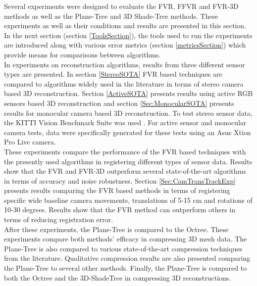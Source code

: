 Several experiments were designed to evaluate the FVR, FFVR and FVR-3D methods as well as the Plane-Tree and 3D Shade-Tree methods. These experiments as well as their conditions and results are presented in this section. In the next section (section \ref{ToolsSection}), the tools used to run the experiments are introduced along with various error metrics (section \ref{metricsSection}) which provide means for comparisons between algorithms. \\

In experiments on reconstruction algorithms, results from three different sensor types are presented. In section \ref{StereoSOTA} FVR based techniques are compared to algorithms widely used in the literature in terms of stereo camera based 3D reconstruction. Section \ref{ActiveSOTA} presents results using active RGB sensors based 3D reconstruction and section \ref{Sec:MonocularSOTA} presents results for monocular camera based 3D reconstruction. To test stereo sensor data, the KITTI Vision Benchmark Suite was used \cite{Geiger13Vision}. For active sensor and monocular camera tests, data were specifically generated for these tests using an Asus Xtion Pro Live camera. \\

These experiments compare the performance of the FVR based techniques with the presently used algorithms in registering different types of sensor data. Results show that the FVR and FVR-3D outperform several state-of-the-art algorithms in terms of accuracy and noise robustness. Section \ref{Sec:CamTransTrackExp} presents results comparing the FVR based methods in terms of registering specific wide baseline camera movements, translations of 5-15 cm and rotations of 10-30 degrees. Results show that the FVR method can outperform others in terms of reducing registration error. \\

After these experiments, the Plane-Tree is compared to the Octree. These experiments compare both methods' efficacy in compressing 3D mesh data. The Plane-Tree is also compared to various state-of-the-art compression techniques from the literature. Qualitative compression results are also presented comparing the Plane-Tree to several other methods. Finally, the Plane-Tree is compared to both the Octree and the 3D-ShadeTree in compressing 3D reconstructions. \\
